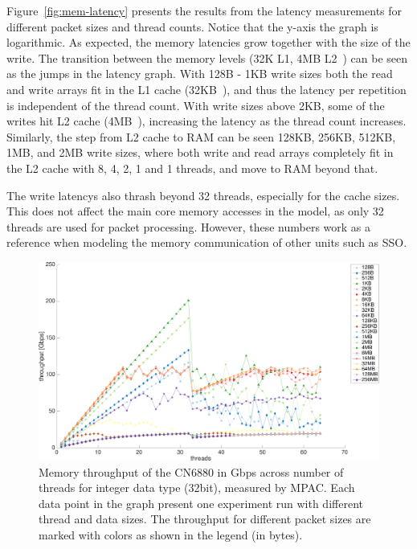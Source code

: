 Figure~\ref{fig:mem-latency} presents the results from the latency measurements for different packet sizes and thread counts. Notice that the y-axis the graph is logarithmic. As expected, the memory latencies grow together with the size of the write. The transition between the memory levels (32K L1, 4MB L2~\cite{cavium:2010:fundamentals}) can be seen as the jumps in the latency graph. With 128B - 1KB write sizes both the read and write arrays fit in the L1 cache (32KB~\cite{cavium:2010:fundamentals}), and thus the latency per repetition is independent of the thread count. With write sizes above 2KB, some of the writes hit L2 cache (4MB~\cite{cavium:2010:fundamentals}), increasing the latency as the thread count increases. Similarly, the step from L2 cache to RAM can be seen 128KB, 256KB, 512KB, 1MB, and 2MB write sizes, where both write and read arrays completely fit in the L2 cache with 8, 4, 2, 1 and 1 threads, and move to RAM beyond that.

The write latencys also thrash beyond 32 threads, especially for the cache sizes. This does not affect the main core memory accesses in the model, as only 32 threads are used for packet processing. However, these numbers work as a reference when modeling the memory communication of other units such as SSO.

\begin{figure}[]
  \begin{center}
    \includegraphics[width=\textwidth]{images/mem-throughput.pdf}
    \caption{Memory throughput of the CN6880 in Gbps across number of threads for integer data type (32bit), measured by MPAC. Each data point in the graph present one experiment run with different thread and data sizes. The throughput for different packet sizes are marked with colors as shown in the legend (in bytes).}
    \label{fig:mem-throughput}
  \end{center}
\end{figure}

